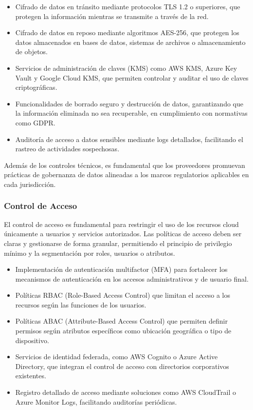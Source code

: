 {                \begin{itemize}
                    \item Cifrado de datos en tránsito mediante protocolos TLS 1.2 o superiores, que protegen la información mientras se transmite a través de la red.
                    \item Cifrado de datos en reposo mediante algoritmos AES-256, que protegen los datos almacenados en bases de datos, sistemas de archivos o almacenamiento de objetos.
                    \item Servicios de administración de claves (KMS) como AWS KMS, Azure Key Vault y Google Cloud KMS, que permiten controlar y auditar el uso de claves criptográficas.
                    \item Funcionalidades de borrado seguro y destrucción de datos, garantizando que la información eliminada no sea recuperable, en cumplimiento con normativas como GDPR.
                    \item Auditoría de acceso a datos sensibles mediante logs detallados, facilitando el rastreo de actividades sospechosas.
                \end{itemize}
                
                Además de los controles técnicos, es fundamental que los proveedores promuevan prácticas de gobernanza de datos alineadas a los marcos regulatorios aplicables en cada jurisdicción.
                
            \subsubsection{Control de Acceso}
                El control de acceso es fundamental para restringir el uso de los recursos cloud únicamente a usuarios y servicios autorizados. Las políticas de acceso deben ser claras y gestionarse de forma granular, permitiendo el principio de privilegio mínimo y la segmentación por roles, usuarios o atributos.
                
                \begin{itemize}
                    \item Implementación de autenticación multifactor (MFA) para fortalecer los mecanismos de autenticación en los accesos administrativos y de usuario final.
                    \item Políticas RBAC (Role-Based Access Control) que limitan el acceso a los recursos según las funciones de los usuarios.
                    \item Políticas ABAC (Attribute-Based Access Control) que permiten definir permisos según atributos específicos como ubicación geográfica o tipo de dispositivo.
                    \item Servicios de identidad federada, como AWS Cognito o Azure Active Directory, que integran el control de acceso con directorios corporativos existentes.
                    \item Registro detallado de acceso mediante soluciones como AWS CloudTrail o Azure Monitor Logs, facilitando auditorías periódicas.
                \end{itemize}
                
}
